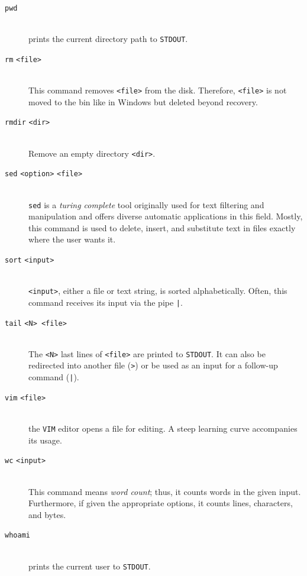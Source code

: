 \documentclass[9pt,tutorial]{livecoms}
\newcommand{\code}[1]{\colorbox{light-gray}{\texttt{#1}}}
\begin{document}
\begin{description}
	 \item[\code{pwd}]\hfill \\ 
	 prints the current directory path to \texttt{STDOUT}.
	 
	 \item[\code{rm} \texttt{<file>}]\hfill \\ 
	 This command removes \texttt{<file>} from the disk. Therefore, \texttt{<file>} is not moved to the bin like in Windows but deleted beyond recovery.
	 
	 \item[\code{rmdir} \texttt{<dir>}]\hfill \\ 
	 Remove an empty directory \texttt{<dir>}.

	\item[\code{sed} \texttt{<option>} \texttt{<file>}]\hfill \\ 
	 \code{sed} is a \textit{turing complete} tool originally used for text filtering and manipulation and offers diverse automatic applications in this field. Mostly, this command is used to delete, insert, and substitute text in files exactly where the user wants it.
	 
	 \item[\code{sort} \texttt{<input>}]\hfill \\ 
	 \texttt{<input>}, either a file or text string, is sorted alphabetically. Often, this command receives its input via the pipe \code{|}.
	 
	 \item[\code{tail} \texttt{<N> <file>}]\hfill \\ 
	 The \texttt{<N>} last lines of \texttt{<file>} are printed to \texttt{STDOUT}. It can also be redirected into another file (\code{>}) or be used as an input for a follow-up command (\code{|}).
	 
	 \item[\code{vim} \texttt{<file>}]\hfill \\ 
	 the \texttt{VIM} editor opens a file for editing. A steep learning curve accompanies its usage.
	 
	 \item[\code{wc} \texttt{<input>}]\hfill \\ 
	 This command means \textit{word count}; thus, it counts words in the given input. Furthermore, if given the appropriate options, it counts lines, characters, and bytes.
	 
	 \item[\code{whoami}]\hfill \\
	 prints the current user to \texttt{STDOUT}.
\end{description}
\end{document}

